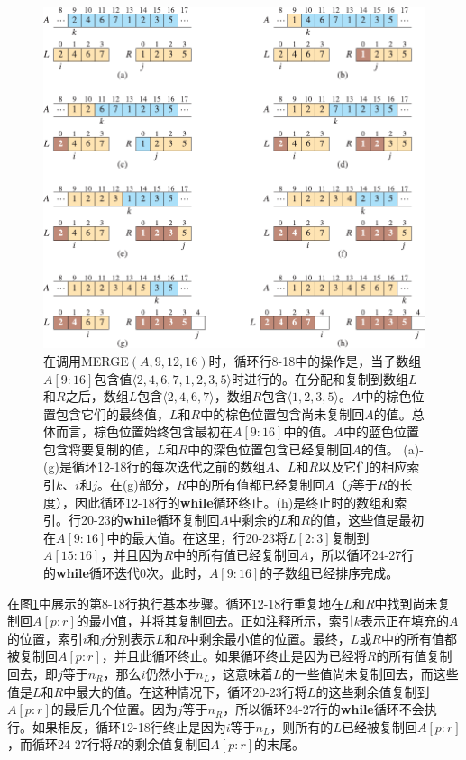 \documentclass[lang=cn,newtx,10pt,scheme=chinese]{elegantbook}
\begin{document}
\begin{figure}[htbp]
    \centering
    \includegraphics{算法导论第四版插图/第二章/归并过程示意图.pdf}
    \caption{在调用MERGE$(A,9,12,16)$时，循环行8-18中的操作是，当子数组$A[9:16]$包含值$\langle 2,4,6,7,1,2,3,5 \rangle$时进行的。在分配和复制到数组$L$和$R$之后，数组$L$包含$\langle 2,4,6,7 \rangle$，数组$R$包含$\langle 1,2,3,5 \rangle$。$A$中的棕色位置包含它们的最终值，$L$和$R$中的棕色位置包含尚未复制回$A$的值。总体而言，棕色位置始终包含最初在$A[9:16]$中的值。$A$中的蓝色位置包含将要复制的值，$L$和$R$中的深色位置包含已经复制回$A$的值。 (a)-(g)是循环12-18行的每次迭代之前的数组$A$、$L$和$R$以及它们的相应索引$k$、$i$和$j$。在(g)部分，$R$中的所有值都已经复制回$A$（$j$等于$R$的长度），因此循环12-18行的\textbf{while}循环终止。(h)是终止时的数组和索引。行20-23的\textbf{while}循环复制回$A$中剩余的$L$和$R$的值，这些值是最初在$A[9:16]$中的最大值。在这里，行20-23将$L[2:3]$复制到$A[15:16]$，并且因为$R$中的所有值已经复制回$A$，所以循环24-27行的\textbf{while}循环迭代0次。此时，$A[9:16]$的子数组已经排序完成。}
    \label{fig:归并过程示意图}
\end{figure}

在图\ref{fig:归并过程示意图}中展示的第8-18行执行基本步骤。循环12-18行重复地在$L$和$R$中找到尚未复制回$A[p:r]$的最小值，并将其复制回去。正如注释所示，索引$k$表示正在填充的$A$的位置，索引$i$和$j$分别表示$L$和$R$中剩余最小值的位置。最终，$L$或$R$中的所有值都被复制回$A[p:r]$，并且此循环终止。如果循环终止是因为已经将$R$的所有值复制回去，即$j$等于$n_R$，那么$i$仍然小于$n_L$，这意味着$L$的一些值尚未复制回去，而这些值是$L$和$R$中最大的值。在这种情况下，循环20-23行将$L$的这些剩余值复制到$A[p:r]$的最后几个位置。因为$j$等于$n_R$，所以循环24-27行的\textbf{while}循环不会执行。如果相反，循环12-18行终止是因为$i$等于$n_L$，则所有的$L$已经被复制回$A[p:r]$，而循环24-27行将$R$的剩余值复制回$A[p:r]$的末尾。
\end{document}
